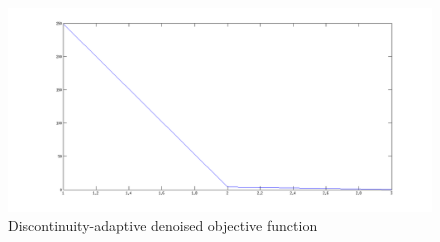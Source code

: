 \documentclass[11pt]{article}
\begin{document}
\begin{figure}[H]
\caption{Discontinuity-adaptive denoised objective function}
\begin{center}
\includegraphics[scale=0.5]{discObj}
\end{center}
\end{figure}
\end{document}
